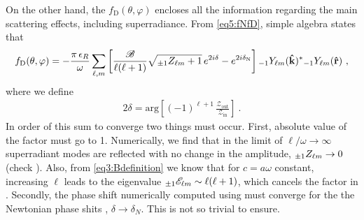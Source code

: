 On the other hand, the $f_\mathrm{D}(\theta,\varphi)$ encloses all the information regarding the main scattering effects, including superradiance.
From \eqref{eq5:fNfD}, simple algebra states that
\begin{align}
    \label{eq5:fD}
    f_\mathrm{D}(\theta,\varphi) = - \frac{\pi \,\epsilon_R}{\omega}
    \sum_{\ell,m} \left[ \frac{\mathscr{B}}{\ell(\ell+1)} \sqrt{ \uu[\pm 1]{Z}{\ell m} +1 } \,e^{2 i \delta } - e^{2 i \delta_\mathrm{N} } \right]
    \uu[-1]{Y}{\ell m}(\mathbf{\hat{k}})^{*} \uu[-1]{Y}{\ell m}(\mathbf{\hat{r}}) ~,
\end{align}
where we define
\begin{align}
    \label{eq5:phaseShiftD}
    2 \delta = \mathrm{arg} \left[ (-1)^{\ell+1} \,\frac{\mathscr{Z}_\mathrm{out}}{\mathscr{Z}_\mathrm{in}} \right] ~.
\end{align}
In order of this sum to converge two things must occur.
First, absolute value of the factor  must go to 1.
Numerically, we find that in the limit of $\ell/\omega\to \infty$ superradiant modes are reflected with no change in the amplitude, $\uu[\pm 1]{Z}{\ell m}\to 0$ (check ).
Also, from \eqref{eq3:Bdefinition} we know that for $c=a\omega$ constant, increasing $\ell$ leads to the eigenvalue $\uu[\pm 1]{\mathscr{E}}{\ell m} \sim \ell(\ell+1)$, which cancels the factor in .
Secondly, the phase shift numerically computed using  must converge for the the Newtonian phase shits , $\delta\to\delta_N$.
This is not so trivial to ensure.


\cleardoublepage
